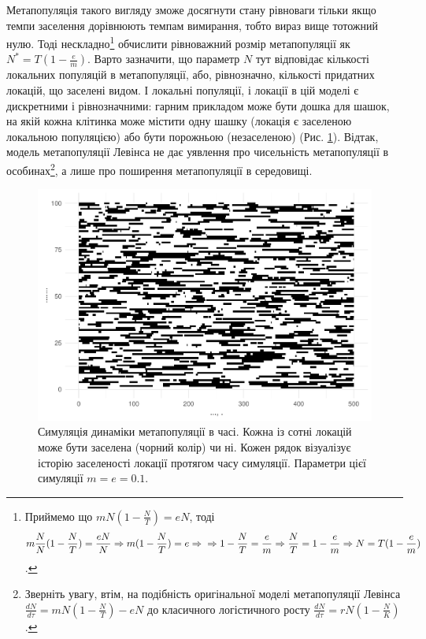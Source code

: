 \documentclass[
  11pt,
]{book}
\begin{document}
Метапопуляція такого вигляду зможе досягнути стану рівноваги тільки якщо темпи заселення дорівнюють темпам вимирання, тобто вираз вище тотожний нулю. Тоді нескладно\footnote{Приймемо що \(mN(1 - \frac{N}{T}) = eN\), тоді \[m \frac{N}{N}(1 - \frac{N}{T}) = \frac{eN}{N} \Rightarrow m(1 - \frac{N}{T}) = e \Rightarrow \\ \Rightarrow 1 - \frac{N}{T} = \frac{e}{m} \Rightarrow \frac{N}{T} = 1 - \frac{e}{m} \Rightarrow N = T(1 - \frac{e}{m})\].} обчислити рівноважний розмір метапопуляції як \(N^* = T(1 - \frac{e}{m})\). Варто зазначити, що параметр \(N\) тут відповідає кількості локальних популяцій в метапопуляції, або, рівнозначно, кількості придатних локацій, що заселені видом. І локальні популяції, і локації в цій моделі є дискретними і рівнозначними: гарним прикладом може бути дошка для шашок, на якій кожна клітинка може містити одну шашку (локація є заселеною локальною популяцією) або бути порожньою (незаселеною) (Рис. \ref{fig:fig-metapop-dyn}). Відтак, модель метапопуляції Левінса не дає уявлення про чисельність метапопуляції в особинах\footnote{Зверніть увагу, втім, на подібність оригінальної моделі метапопуляції Левінса \(\frac{dN}{d\tau} = mN(1-\frac{N}{T}) - eN\) до класичного логістичного росту \(\frac{dN}{d\tau} = rN(1-\frac{N}{K})\).}, а лише про поширення метапопуляції в середовищі.

\begin{figure}

{\centering \includegraphics{bookdown-demo_files/figure-latex/fig-metapop-dyn-1} 

}

\caption{Симуляція динаміки метапопуляції в часі. Кожна із сотні локацій може бути заселена (чорний колір) чи ні. Кожен рядок візуалізує історію заселеності локації протягом часу симуляції. Параметри цієї симуляції $m = e = 0.1$.}\label{fig:fig-metapop-dyn}
\end{figure}
\end{document}
